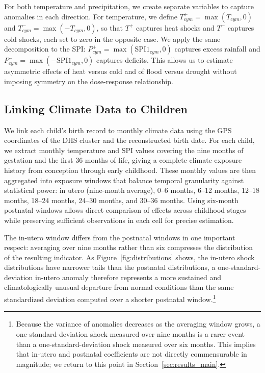\documentclass[a4paper]{article}
\begin{document}
For both temperature and precipitation, we create separate variables to capture anomalies in each direction. For temperature, we define $T^+_{cym} = \max(T_{cym}, 0)$ and $T^-_{cym} = \max(-T_{cym}, 0)$, so that $T^+$ captures heat shocks and $T^-$ captures cold shocks, each set to zero in the opposite case. We apply the same decomposition to the SPI: $P^+_{cym} = \max(\text{SPI1}_{cym}, 0)$ captures excess rainfall and $P^-_{cym} = \max(-\text{SPI1}_{cym}, 0)$ captures deficits. This allows us to estimate asymmetric effects of heat versus cold and of flood versus drought without imposing symmetry on the dose-response relationship.

\subsection{Linking Climate Data to Children} \label{sec:data_link}

We link each child's birth record to monthly climate data using the GPS coordinates of the DHS cluster and the reconstructed birth date. For each child, we extract monthly temperature and SPI values covering the nine months of gestation and the first 36 months of life, giving a complete climate exposure history from conception through early childhood. These monthly values are then aggregated into exposure windows that balance temporal granularity against statistical power: in utero (nine-month average), 0--6 months, 6--12 months, 12--18 months, 18--24 months, 24--30 months, and 30--36 months. Using six-month postnatal windows allows direct comparison of effects across childhood stages while preserving sufficient observations in each cell for precise estimation.

The in-utero window differs from the postnatal windows in one important respect: averaging over nine months rather than six compresses the distribution of the resulting indicator. As Figure~\ref{fig:distributions} shows, the in-utero shock distributions have narrower tails than the postnatal distributions, a one-standard-deviation in-utero anomaly therefore represents a more sustained and climatologically unusual departure from normal conditions than the same standardized deviation computed over a shorter postnatal window.\footnote{Because the variance of anomalies decreases as the averaging window grows, a one-standard-deviation shock measured over nine months is a rarer event than a one-standard-deviation shock measured over six months. This implies that in-utero and postnatal coefficients are not directly commensurable in magnitude; we return to this point in Section~\ref{sec:results_main}.}
\end{document}
